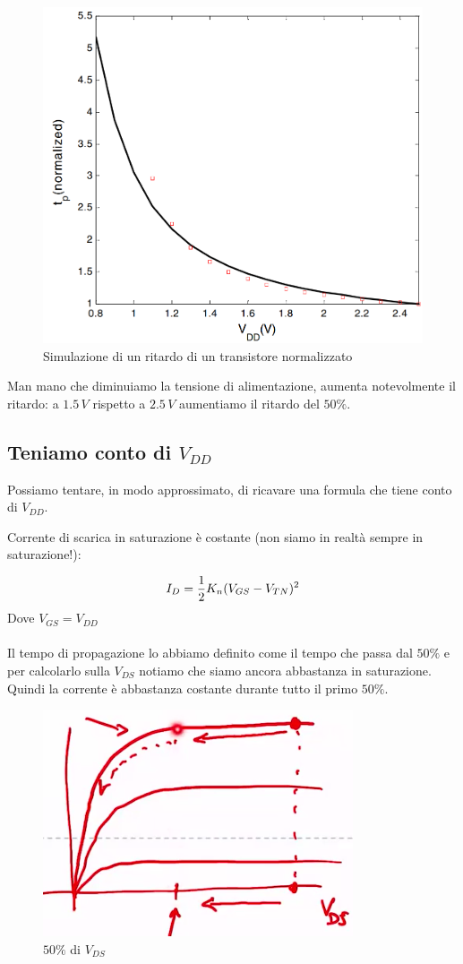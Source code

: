 \begin{figure}[htbp]
    \centering
    \includegraphics[width=0.45\linewidth]{img/ritardo_vdd.png}
    \caption{Simulazione di un ritardo di un transistore normalizzato}    
\end{figure}

Man mano che diminuiamo la tensione di alimentazione, aumenta notevolmente il ritardo: a $1.5\,V$ rispetto a $2.5\,V$ aumentiamo il ritardo del $50\%$.


\subsection{Teniamo conto di $V_{DD}$}

Possiamo tentare, in modo approssimato, di ricavare una formula che tiene conto di $V_{DD}$.

Corrente di	scarica in	saturazione è costante (non	siamo in	realtà	sempre	in	saturazione!):

\begin{equation*}
    I_D = \frac{1}{2}K_n(V_{GS} - V_{TN})^2
\end{equation*}
\newpage
Dove $V_{GS} = V_{DD}$
\paragraph{}
Il tempo di propagazione lo abbiamo definito come il tempo che passa dal $50\%$ e per calcolarlo sulla $V_{DS}$ notiamo che siamo ancora abbastanza in saturazione. Quindi la corrente è abbastanza costante durante tutto il primo  $50\%$.

\begin{figure}[htbp]
    \centering
    \includegraphics[width=0.37\linewidth]{img/saturaztion.png}
    \caption{$50\%$ di $V_{DS}$}    
\end{figure}

